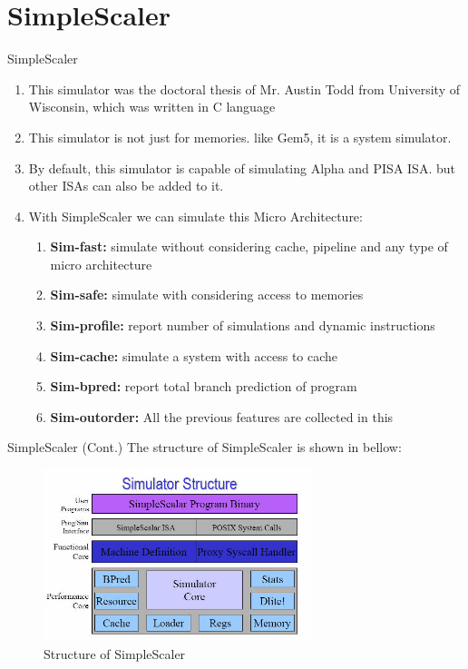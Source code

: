 \documentclass{beamer}
\begin{document}
\section{SimpleScaler}

\begin{frame}{SimpleScaler}
	\begin{enumerate}
		\item This simulator was the doctoral thesis of Mr. Austin Todd from University of Wisconsin, which was written in C language
		
		\item This simulator is not just for memories. like Gem5, it is a system simulator.
		
		\item By default, this simulator is capable of simulating Alpha and PISA ISA. but other ISAs can also be added to it. 
		
		\item With SimpleScaler we can simulate this Micro Architecture:
		\begin{enumerate}
			\item \textbf{Sim-fast:} simulate without considering cache, pipeline and any type of micro architecture
			\item \textbf{Sim-safe:} simulate with considering access to memories
			\item \textbf{Sim-profile:} report number of simulations and dynamic instructions
			\item \textbf{Sim-cache:} simulate a system with access to cache
			\item \textbf{Sim-bpred:} report total branch prediction of program
			\item \textbf{Sim-outorder: }All the previous features are collected in this
		\end{enumerate}
	\end{enumerate}
\end{frame}



\begin{frame}{SimpleScaler (Cont.)}
	The structure of SimpleScaler is shown in bellow:
	
	\begin{figure}
		\centering
		\includegraphics[height=5cm]{images/img16}
		\caption{Structure of SimpleScaler}
		\label{fig:Structure of SimpleScaler}
	\end{figure}	
\end{frame}
\end{document}
